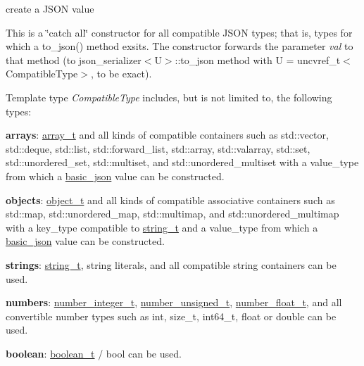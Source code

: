 create a J\+S\+ON value 

This is a \char`\"{}catch all\char`\"{} constructor for all compatible J\+S\+ON types; that is, types for which a {\ttfamily to\+\_\+json()} method exsits. The constructor forwards the parameter {\itshape val} to that method (to {\ttfamily json\+\_\+serializer$<$U$>$\+::to\+\_\+json} method with {\ttfamily U = uncvref\+\_\+t$<$Compatible\+Type$>$}, to be exact).

Template type {\itshape Compatible\+Type} includes, but is not limited to, the following types\+:
\begin{DoxyItemize}
\item {\bfseries arrays}\+: \mbox{\hyperlink{classnlohmann_1_1basic__json_ae095578e03df97c5b3991787f1056374}{array\+\_\+t}} and all kinds of compatible containers such as {\ttfamily std\+::vector}, {\ttfamily std\+::deque}, {\ttfamily std\+::list}, {\ttfamily std\+::forward\+\_\+list}, {\ttfamily std\+::array}, {\ttfamily std\+::valarray}, {\ttfamily std\+::set}, {\ttfamily std\+::unordered\+\_\+set}, {\ttfamily std\+::multiset}, and {\ttfamily std\+::unordered\+\_\+multiset} with a {\ttfamily value\+\_\+type} from which a \mbox{\hyperlink{classnlohmann_1_1basic__json}{basic\+\_\+json}} value can be constructed.
\item {\bfseries objects}\+: \mbox{\hyperlink{classnlohmann_1_1basic__json_aa1eb13d5aa86f80cbee6c58e90fbaf49}{object\+\_\+t}} and all kinds of compatible associative containers such as {\ttfamily std\+::map}, {\ttfamily std\+::unordered\+\_\+map}, {\ttfamily std\+::multimap}, and {\ttfamily std\+::unordered\+\_\+multimap} with a {\ttfamily key\+\_\+type} compatible to \mbox{\hyperlink{classnlohmann_1_1basic__json_a61f8566a1a85a424c7266fb531dca005}{string\+\_\+t}} and a {\ttfamily value\+\_\+type} from which a \mbox{\hyperlink{classnlohmann_1_1basic__json}{basic\+\_\+json}} value can be constructed.
\item {\bfseries strings}\+: \mbox{\hyperlink{classnlohmann_1_1basic__json_a61f8566a1a85a424c7266fb531dca005}{string\+\_\+t}}, string literals, and all compatible string containers can be used.
\item {\bfseries numbers}\+: \mbox{\hyperlink{classnlohmann_1_1basic__json_a98e611d67b7bd75307de99c9358ab2dc}{number\+\_\+integer\+\_\+t}}, \mbox{\hyperlink{classnlohmann_1_1basic__json_ab906e29b5d83ac162e823ada2156b989}{number\+\_\+unsigned\+\_\+t}}, \mbox{\hyperlink{classnlohmann_1_1basic__json_a88d6103cb3620410b35200ee8e313d97}{number\+\_\+float\+\_\+t}}, and all convertible number types such as {\ttfamily int}, {\ttfamily size\+\_\+t}, {\ttfamily int64\+\_\+t}, {\ttfamily float} or {\ttfamily double} can be used.
\item {\bfseries boolean}\+: \mbox{\hyperlink{classnlohmann_1_1basic__json_a4c919102a9b4fe0d588af64801436082}{boolean\+\_\+t}} / {\ttfamily bool} can be used.
\end{DoxyItemize}

